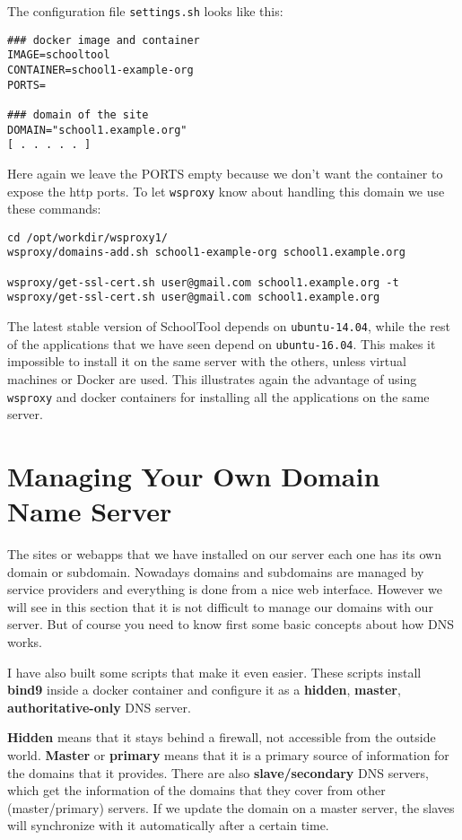 \documentclass[a4paper]{article}
\begin{document}
The configuration file \verb~settings.sh~ looks like this:
\begin{verbatim}
### docker image and container
IMAGE=schooltool
CONTAINER=school1-example-org
PORTS=

### domain of the site
DOMAIN="school1.example.org"
[ . . . . . ]
\end{verbatim}

Here again we leave the PORTS empty because we don't want the
container to expose the http ports. To let \verb/wsproxy/ know about
handling this domain we use these commands:
\begin{verbatim}
cd /opt/workdir/wsproxy1/
wsproxy/domains-add.sh school1-example-org school1.example.org

wsproxy/get-ssl-cert.sh user@gmail.com school1.example.org -t
wsproxy/get-ssl-cert.sh user@gmail.com school1.example.org
\end{verbatim}

The latest stable version of SchoolTool depends on \verb/ubuntu-14.04/,
while the rest of the applications that we have seen depend on
\verb/ubuntu-16.04/.  This makes it impossible to install it on the same
server with the others, unless virtual machines or Docker are
used. This illustrates again the advantage of using \verb/wsproxy/ and
docker containers for installing all the applications on the same
server.


\section{Managing Your Own Domain Name Server}

The sites or webapps that we have installed on our server each one has
its own domain or subdomain. Nowadays domains and subdomains are
managed by service providers and everything is done from a nice web
interface. However we will see in this section that it is not
difficult to manage our domains with our server. But of course you
need to know first some basic concepts about how DNS works.

I have also built some scripts that make it even easier. These scripts
install \textbf{bind9} inside a docker container and configure it as a
\textbf{hidden}, \textbf{master}, \textbf{authoritative-only} DNS
server.

\textbf{Hidden} means that it stays behind a firewall, not accessible
from the outside world. \textbf{Master} or \textbf{primary} means that
it is a primary source of information for the domains that it
provides. There are also \textbf{slave/secondary} DNS servers, which
get the information of the domains that they cover from other
(master/primary) servers. If we update the domain on a master server,
the slaves will synchronize with it automatically after a certain
time.
\end{document}
